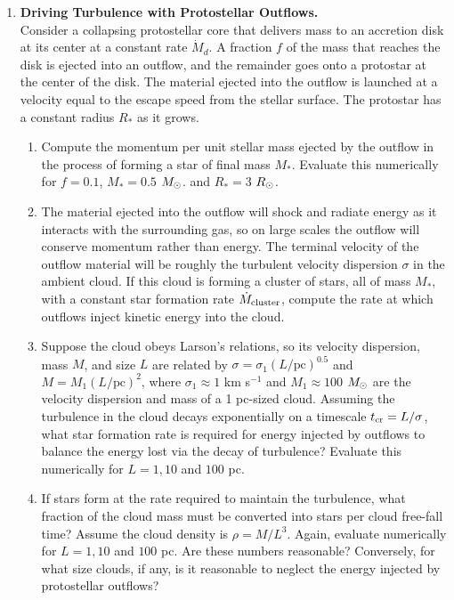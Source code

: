 \begin{enumerate}
\item \textbf{Driving Turbulence with Protostellar Outflows.}\\
Consider a collapsing protostellar core that delivers mass to an accretion disk at its center at a constant rate $\dot{M}_d$. A fraction $f$ of the mass that reaches the disk is ejected into an outflow, and the remainder goes onto a protostar at the center of the disk. The material ejected into the outflow is launched at a velocity equal to the escape speed from the stellar surface. The protostar has a constant radius $R_*$ as it grows.
\begin{enumerate}
\item Compute the momentum per unit stellar mass ejected by the outflow in the process of forming a star of final mass $M_*$. Evaluate this numerically for $f=0.1$, $M_* = 0.5$ $M_{\odot}$. and $R_* = 3$ $R_{\odot}$.
\item The material ejected into the outflow will shock and radiate energy as it interacts with the surrounding gas, so on large scales the outflow will conserve momentum rather than energy. The terminal velocity of the outflow material will be roughly the turbulent velocity dispersion $\sigma$ in the ambient cloud. If this cloud is forming a cluster of stars, all of mass $M_*$, with a constant star formation rate $\dot{M}_{\rm cluster}$, compute the rate at which outflows inject kinetic energy into the cloud.
\item Suppose the cloud obeys Larson's relations, so its velocity dispersion, mass $M$, and size $L$ are related by $\sigma = \sigma_1 (L/\mbox{pc})^{0.5}$ and $M=M_1 (L/\mbox{pc})^2$, where $\sigma_1 \approx 1$ km s$^{-1}$ and $M_1\approx 100$ $M_{\odot}$ are the velocity dispersion and mass of a 1 pc-sized cloud. Assuming the turbulence in the cloud decays exponentially on a timescale $t_{\rm cr}=L/\sigma$, what star formation rate is required for energy injected by outflows to balance the energy lost via the decay of turbulence? Evaluate this numerically for $L = 1, 10$ and $100$ pc.
\item If stars form at the rate required to maintain the turbulence, what fraction of the cloud mass must be converted into stars per cloud free-fall time? Assume the cloud density is $\rho=M/L^3$. Again, evaluate numerically for $L = 1,10$ and $100$ pc. Are these numbers reasonable? Conversely, for what size clouds, if any, is it reasonable to neglect the energy injected by protostellar outflows?\\
\end{enumerate}


\end{enumerate}
